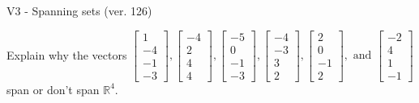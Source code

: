 \begin{exercise}
  \begin{exerciseTitle}V3 - Spanning sets (ver. 126)\end{exerciseTitle}
  \begin{exerciseStatement}
    Explain why the vectors \(\left[\begin{array}{r}
1 \\
-4 \\
-1 \\
-3
\end{array}\right] , \left[\begin{array}{r}
-4 \\
2 \\
4 \\
4
\end{array}\right] , \left[\begin{array}{r}
-5 \\
0 \\
-1 \\
-3
\end{array}\right] , \left[\begin{array}{r}
-4 \\
-3 \\
3 \\
2
\end{array}\right] , \left[\begin{array}{r}
2 \\
0 \\
-1 \\
2
\end{array}\right] , \text{ and } \left[\begin{array}{r}
-2 \\
4 \\
1 \\
-1
\end{array}\right]\) span or don't span \(\mathbb{R}^4\). 
	



\end{exerciseStatement}
\end{exercise}
